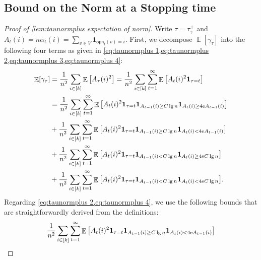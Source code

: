 \documentclass[letterpaper,11pt]{article}
\newcommand{\indicator}{\mathbf{1}}
\DeclareMathOperator*{\E}{\mathbb{E}}
\newcommand{\e}{\mathrm{e}}
\newcommand{\varianceref}[1]{\variance_{\mbox{\tiny\ref{#1}}}}
\newcommand{\alphanorm}{\gamma}
\newcommand{\opinion}{\mathsf{opn}}
\newcommand{\variance}{s}
\newcommand{\taunormplus}{\tau^{+}_{\alphanorm}}
\newcommand{\tauiup}{\tau^{\uparrow}_i}
\newcommand{\tauidown}{\tau^{\downarrow}_i}
\newcommand{\taujup}{\tau^{\uparrow}_j}
\newcommand{\taujdown}{\tau^{\downarrow}_j}
\begin{document}

\subsection{Bound on the Norm at a Stopping time}\label{sec:deferred norm grows}
\begin{proof}[Proof of \cref{lem:taunormplus expectation of norm}]
    Write $\tau=\taunormplus$ and $A_t(i)=n\alpha_t(i)=\sum_{v\in V}\indicator_{\opinion_t(v)=i}$.
    First, we decompose $\E[\alphanorm_\tau]$ into the following four terms as given in \cref{eq:taunormplus 1,eq:taunormplus 2,eq:taunormplus 3,eq:taunormplus 4}:
    \begin{align}
    \E[\alphanorm_\tau]
    &=\frac{1}{n^2}\sum_{i\in [k]}\E\qty[A_\tau(i)^2]
    =\frac{1}{n^2}\sum_{i\in [k]}\sum_{t=1}^\infty\E\qty[A_t(i)^2\indicator_{\tau=t}] \nonumber \\
    &=\frac{1}{n^2}\sum_{i\in [k]}\sum_{t=1}^\infty\E\qty[A_t(i)^2\indicator_{\tau=t}\indicator_{A_{t-1}(i)\geq C\lg n}\indicator_{A_{t}(i)\geq 4\e A_{t-1}(i)}] \label{eq:taunormplus 1}\\
    &+\frac{1}{n^2}\sum_{i\in [k]}\sum_{t=1}^\infty\E\qty[A_t(i)^2\indicator_{\tau=t}\indicator_{A_{t-1}(i)\geq C\lg n}\indicator_{A_{t}(i)< 4\e A_{t-1}(i)}] \label{eq:taunormplus 2}\\
    &+\frac{1}{n^2}\sum_{i\in [k]}\sum_{t=1}^\infty\E\qty[A_t(i)^2\indicator_{\tau=t}\indicator_{A_{t-1}(i)< C\lg n}\indicator_{A_{t}(i)\geq 4\e C\lg n}] \label{eq:taunormplus 3}\\
    &+\frac{1}{n^2}\sum_{i\in [k]}\sum_{t=1}^\infty\E\qty[A_t(i)^2\indicator_{\tau=t}\indicator_{A_{t-1}(i)< C\lg n}\indicator_{A_{t}(i)<4\e C\lg n}]. \label{eq:taunormplus 4}
    \end{align}
    Regarding \cref{eq:taunormplus 2,eq:taunormplus 4}, we use the following bounds that are straightforwardly derived from the definitions:
    \begin{align*}
        &\frac{1}{n^2}\sum_{i\in [k]}\sum_{t=1}^\infty\E\qty[A_t(i)^2\indicator_{\tau=t}\indicator_{A_{t-1}(i)\geq C\lg n}\indicator_{A_{t}(i)< 4\e A_{t-1}(i)}] \\

\end{align*}
\end{proof}
\end{document}
